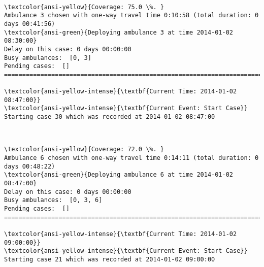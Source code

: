 \documentclass[11pt]{article}
\begin{document}
    \begin{center}
    \end{center}
    { \hspace*{\fill} \\}
    
    \begin{Verbatim}[commandchars=\\\{\}]
\textcolor{ansi-yellow}{Coverage: 75.0 \%. }
Ambulance 3 chosen with one-way travel time 0:10:58 (total duration: 0 days 00:41:56)
\textcolor{ansi-green}{Deploying ambulance 3 at time 2014-01-02 08:30:00}
Delay on this case: 0 days 00:00:00
Busy ambulances:  [0, 3]
Pending cases:  []
========================================================================

\textcolor{ansi-yellow-intense}{\textbf{Current Time: 2014-01-02 08:47:00}}
\textcolor{ansi-yellow-intense}{\textbf{Current Event: Start Case}}
Starting case 30 which was recorded at 2014-01-02 08:47:00

    \end{Verbatim}

    \begin{center}
    \end{center}
    { \hspace*{\fill} \\}
    
    \begin{Verbatim}[commandchars=\\\{\}]
\textcolor{ansi-yellow}{Coverage: 72.0 \%. }
Ambulance 6 chosen with one-way travel time 0:14:11 (total duration: 0 days 00:48:22)
\textcolor{ansi-green}{Deploying ambulance 6 at time 2014-01-02 08:47:00}
Delay on this case: 0 days 00:00:00
Busy ambulances:  [0, 3, 6]
Pending cases:  []
========================================================================

\textcolor{ansi-yellow-intense}{\textbf{Current Time: 2014-01-02 09:00:00}}
\textcolor{ansi-yellow-intense}{\textbf{Current Event: Start Case}}
Starting case 21 which was recorded at 2014-01-02 09:00:00

    \end{Verbatim}

    \begin{center}
    \end{center}
    { \hspace*{\fill} \\}
    
\end{document}
